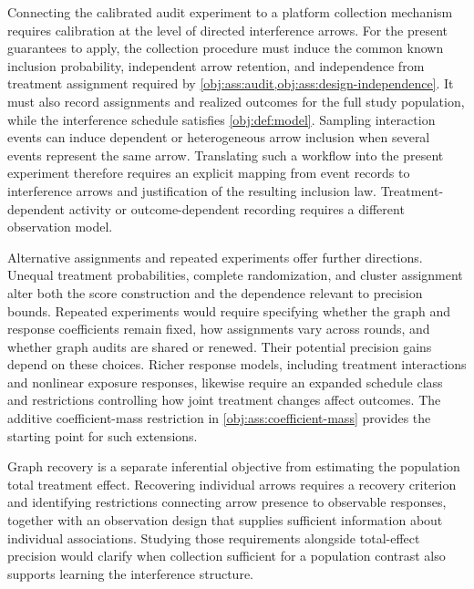 Connecting the calibrated audit experiment to a platform collection mechanism requires calibration at the level of directed interference arrows. For the present guarantees to apply, the collection procedure must induce the common known inclusion probability, independent arrow retention, and independence from treatment assignment required by \cref{obj:ass:audit,obj:ass:design-independence}. It must also record assignments and realized outcomes for the full study population, while the interference schedule satisfies \cref{obj:def:model}. Sampling interaction events can induce dependent or heterogeneous arrow inclusion when several events represent the same arrow. Translating such a workflow into the present experiment therefore requires an explicit mapping from event records to interference arrows and justification of the resulting inclusion law. Treatment-dependent activity or outcome-dependent recording requires a different observation model.

Alternative assignments and repeated experiments offer further directions. Unequal treatment probabilities, complete randomization, and cluster assignment alter both the score construction and the dependence relevant to precision bounds. Repeated experiments would require specifying whether the graph and response coefficients remain fixed, how assignments vary across rounds, and whether graph audits are shared or renewed. Their potential precision gains depend on these choices. Richer response models, including treatment interactions and nonlinear exposure responses, likewise require an expanded schedule class and restrictions controlling how joint treatment changes affect outcomes. The additive coefficient-mass restriction in \cref{obj:ass:coefficient-mass} provides the starting point for such extensions.

Graph recovery is a separate inferential objective from estimating the population total treatment effect. Recovering individual arrows requires a recovery criterion and identifying restrictions connecting arrow presence to observable responses, together with an observation design that supplies sufficient information about individual associations. Studying those requirements alongside total-effect precision would clarify when collection sufficient for a population contrast also supports learning the interference structure.
